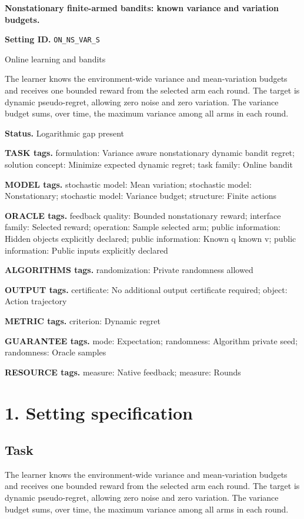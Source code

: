 \documentclass[10pt,a4paper]{article}
\begin{document}
\raggedright

{\LARGE\bfseries\sffamily\color{AtlasNavy} Nonstationary finite-armed bandits: known variance and variation budgets.\par}\vspace{5pt}
\textbf{Setting ID.} \texttt{ON\_\allowbreak{}NS\_\allowbreak{}VAR\_\allowbreak{}S}

Online learning and bandits

The learner knows the environment-wide variance and mean-variation budgets and receives one bounded reward from the selected arm each round. The target is dynamic pseudo-regret, allowing zero noise and zero variation. The variance budget sums, over time, the maximum variance among all arms in each round.

\textbf{Status.} Logarithmic gap present

\textbf{TASK tags.} formulation: Variance aware nonstationary dynamic bandit regret; solution concept: Minimize expected dynamic regret; task family: Online bandit

\textbf{MODEL tags.} stochastic model: Mean variation; stochastic model: Nonstationary; stochastic model: Variance budget; structure: Finite actions

\textbf{ORACLE tags.} feedback quality: Bounded nonstationary reward; interface family: Selected reward; operation: Sample selected arm; public information: Hidden objects explicitly declared; public information: Known q known v; public information: Public inputs explicitly declared

\textbf{ALGORITHMS tags.} randomization: Private randomness allowed

\textbf{OUTPUT tags.} certificate: No additional output certificate required; object: Action trajectory

\textbf{METRIC tags.} criterion: Dynamic regret

\textbf{GUARANTEE tags.} mode: Expectation; randomness: Algorithm private seed; randomness: Oracle samples

\textbf{RESOURCE tags.} measure: Native feedback; measure: Rounds

\section{1. Setting specification}
\subsection{Task}
The learner knows the environment-wide variance and mean-variation budgets and receives one bounded reward from the selected arm each round. The target is dynamic pseudo-regret, allowing zero noise and zero variation. The variance budget sums, over time, the maximum variance among all arms in each round.
\end{document}
